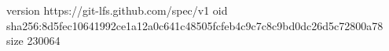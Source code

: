 version https://git-lfs.github.com/spec/v1
oid sha256:8d5fec10641992ce1a12a0c641c48505fcfeb4c9c7c8c9bd0dc26d5c72800a78
size 230064
